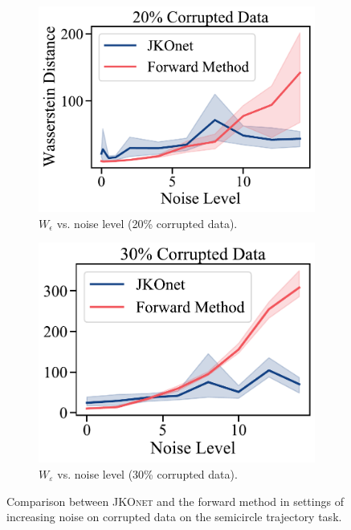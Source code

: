 \begin{figure}[t]
     \begin{subfigure}[t]{0.485\textwidth}
         \centering
         \includegraphics[width=\textwidth]{figures/fig_fb_comp_noise_20.pdf}
         \caption{$W_\epsilon$ vs. noise level (20\% corrupted data).}
     \end{subfigure}
     \hfill
     \begin{subfigure}[t]{0.46\textwidth}
         \centering
         \includegraphics[width=\textwidth]{figures/fig_fb_comp_noise_30.pdf}
         \caption{$W_\varepsilon$ vs. noise level (30\% corrupted data).}
     \end{subfigure}
     \caption{Comparison between \textsc{JKOnet} and the forward method in settings of increasing noise on corrupted data on the semicircle trajectory task.}
     \label{fig:exp_comp_noise}
\end{figure}


